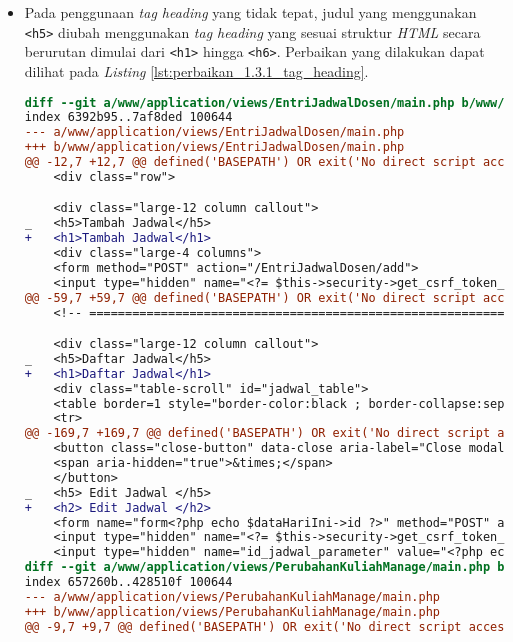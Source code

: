 \begin{itemize}
\item Pada penggunaan \textit{tag heading} yang tidak tepat, judul yang menggunakan \texttt{<h5>} diubah menggunakan \textit{tag heading} yang sesuai struktur \textit{HTML} secara berurutan dimulai dari \texttt{<h1>} hingga \texttt{<h6>}. Perbaikan yang dilakukan dapat dilihat pada \textit{Listing} \ref{lst:perbaikan_1.3.1_tag_heading}.
\begin{lstlisting}[frame=single, label={lst:perbaikan_1.3.1_tag_heading}, language=diff, caption=Perbaikan Kriteria Sukses 1.3.1 pada Bagian \textit{Heading}]
diff --git a/www/application/views/EntriJadwalDosen/main.php b/www/application/views/EntriJadwalDosen/main.php
index 6392b95..7af8ded 100644
--- a/www/application/views/EntriJadwalDosen/main.php
+++ b/www/application/views/EntriJadwalDosen/main.php
@@ -12,7 +12,7 @@ defined('BASEPATH') OR exit('No direct script access allowed');
    <div class="row">

    <div class="large-12 column callout">
_   <h5>Tambah Jadwal</h5>
+   <h1>Tambah Jadwal</h1>
    <div class="large-4 columns">
    <form method="POST" action="/EntriJadwalDosen/add">
    <input type="hidden" name="<?= $this->security->get_csrf_token_name() ?>" value="<?= $this->security->get_csrf_hash() ?>" />
@@ -59,7 +59,7 @@ defined('BASEPATH') OR exit('No direct script access allowed');
    <!-- ===================================================================== Pembentukan Tabel ============================================================================= -->

    <div class="large-12 column callout">
_   <h5>Daftar Jadwal</h5>
+   <h1>Daftar Jadwal</h1>
    <div class="table-scroll" id="jadwal_table">
    <table border=1 style="border-color:black ; border-collapse:separate">
    <tr> 
@@ -169,7 +169,7 @@ defined('BASEPATH') OR exit('No direct script access allowed');
    <button class="close-button" data-close aria-label="Close modal" type="button">
    <span aria-hidden="true">&times;</span>
    </button>
_   <h5> Edit Jadwal </h5>
+   <h2> Edit Jadwal </h2>
    <form name="form<?php echo $dataHariIni->id ?>" method="POST" action="/EntriJadwalDosen/update/<?php echo $dataHariIni->id ?>">
    <input type="hidden" name="<?= $this->security->get_csrf_token_name() ?>" value="<?= $this->security->get_csrf_hash() ?>" />
    <input type="hidden" name="id_jadwal_parameter" value="<?php echo $dataHariIni->id ?>"> </a> <br>
diff --git a/www/application/views/PerubahanKuliahManage/main.php b/www/application/views/PerubahanKuliahManage/main.php
index 657260b..428510f 100644
--- a/www/application/views/PerubahanKuliahManage/main.php
+++ b/www/application/views/PerubahanKuliahManage/main.php
@@ -9,7 +9,7 @@ defined('BASEPATH') OR exit('No direct script access allowed');


\end{lstlisting}
\end{itemize}
